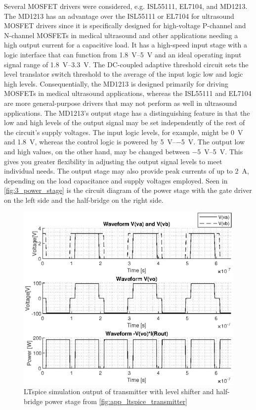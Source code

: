 Several MOSFET drivers were considered, e.g. ISL55111\cite{ISL55111}, EL7104\cite{EL7104}, and MD1213\cite{MD1213}. The MD1213 has an advantage over the ISL55111 or EL7104 for ultrasound MOSFET drivers since it is specifically designed for high-voltage P-channel and N-channel MOSFETs in medical ultrasound and other applications needing a high output current for a capacitive load. It has a high-speed input stage with a logic interface that can function from \qtyrange{1.8}{5}{\volt} and an ideal operating input signal range of \qtyrange{1.8}{3.3}{\volt}. The DC-coupled adaptive threshold circuit sets the level translator switch threshold to the average of the input logic \gls{low} and logic \gls{high} levels. Consequentially, the MD1213 is designed primarily for driving MOSFETs in medical ultrasound applications, whereas the ISL55111 and EL7104 are more general-purpose drivers that may not perform as well in ultrasound applications. The MD1213's output stage has a distinguishing feature in that the \gls{low} and \gls{high} levels of the output signal may be set independently of the rest of the circuit's supply voltages. The input logic levels, for example, might be \qty{0}{\volt} and \qty{1.8}{\volt}, whereas the control logic is powered by \qtyrange[retain-explicit-plus]{+5}{-5}{\volt}. The output \gls{low} and \gls{high} values, on the other hand, may be changed between \qtyrange[retain-explicit-plus]{-5}{+5}{\volt}. This gives you greater flexibility in adjusting the output signal levels to meet individual needs. The output stage may also provide peak currents of up to \qty{2}{\ampere}, depending on the load capacitance and supply voltages employed. Seen in \cref{fig:3_power_stage} is the circuit diagram of the power stage with the gate driver on the left side and the half-bridge on the right side.
\begin{figure}[htbp]
	\centering
	\includegraphics[width=.8\textwidth]{Figures/3_transmitter_sim_out.eps}
	\caption[LTspice simulation output of transmitter]{LTspice simulation output of transmitter with level shifter and half-bridge power stage from \cref{fig:app_ltspice_transmitter}}
	\label{fig:3_transmitter_sim}
\end{figure}
